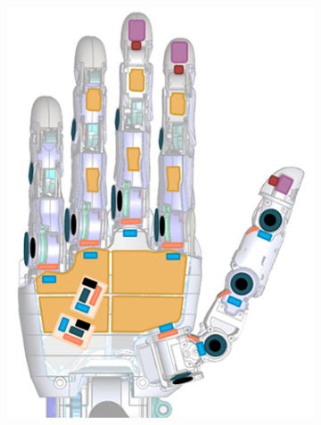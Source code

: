 \documentclass[8pt]{beamer}
\begin{document}
		
		\begin{frame}
		\begin{figure}
				\begin{center}
				
        			\begin{subfigure}[b]{0.4\textwidth}
                		\includegraphics[width=\textwidth]{graphics/MPL_sensorhand.jpg}
                		\label{graph:g5}
        			\end{subfigure}%
        			\begin{subfigure}[b]{0.4\textwidth}

\end{subfigure}
\end{center}
\end{figure}
\end{frame}
\end{document}

